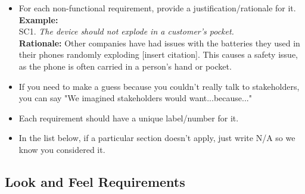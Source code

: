 \documentclass[]{article}
\begin{document}
\begin{itemize}
	\item For each non-functional requirement, provide a justification/rationale for it.\\
	{\bf Example:} \\
	SC1. \emph{The device should not explode in a customer’s pocket.}\\
	{\bf Rationale:} Other companies have had issues with the batteries they used in their phones randomly exploding [insert citation]. This causes a safety issue, as the phone is often carried in a person's hand or pocket.	
	\item If you need to make a guess because you couldn't really talk to stakeholders, you can say "We imagined stakeholders would want...because..."
	\item Each requirement should have a unique label/number for it.
	\item In the list below, if a particular section doesn't apply, just write N/A so we know you considered it.
\end{itemize}

\subsection{Look and Feel Requirements}
\label{sub:look_and_feel_requirements}
\end{document}
